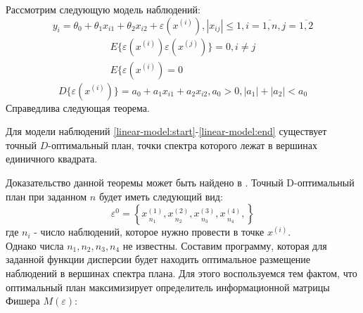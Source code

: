 	
Рассмотрим следующую модель наблюдений:
\begin{equation} \label{linear-model:start}
y_i = \theta_0 + \theta_1 x_{i1} + \theta_2 x_{i2} + \varepsilon(x^{(i)}), |x_{i j}| \le 1, i = \overline{1, n}, j = \overline{1, 2}
\end{equation}
\begin{equation} \begin{split}
E\{\varepsilon(x^{(i)}) \varepsilon(x^{(j)}) \} = 0, i \ne j \\
E\{\varepsilon(x^{(i)}) = 0
\end{split}\end{equation}
\begin{equation}\label{linear-model:end}
D\{ \varepsilon( x^{(i)} ) \} = a_0 + a_1 x_{i1} + a_2 x_{i2},
a_0 > 0, |a_1| + |a_2| < a_0
\end{equation}
Справедлива следующая теорема.
\begin{theorem}
	Для модели наблюдений \eqref{linear-model:start}-\eqref{linear-model:end} существует точный $D$-оптимальный план, точки спектра которого лежат в вершинах единичного квадрата.
\end{theorem}
Доказательство данной теоремы может быть найдено в \cite{kirlitsa2017}.
Точный D-оптимальный план при заданном $n$ будет иметь следующий вид:
\begin{equation}
\varepsilon^{0} = \left \{ 
\underset{n_1} {x^{(1)}},
\underset{n_2} {x^{(2)}},
\underset{n_3} {x^{(3)}},
\underset{n_4} {x^{(4)}},
\right \}
\end{equation}
где $n_i$ - число наблюдений, которое нужно провести в точке $x^{(i)}$.\\
Однако числа $n_1, n_2, n_3, n_4$ не известны. Составим программу, которая для заданной функции дисперсии будет находить оптимальное размещение наблюдений в вершинах спектра плана.
Для этого воспользуемся тем фактом, что оптимальный план максимизирует определитель информационной матрицы Фишера $M(\varepsilon)$:
